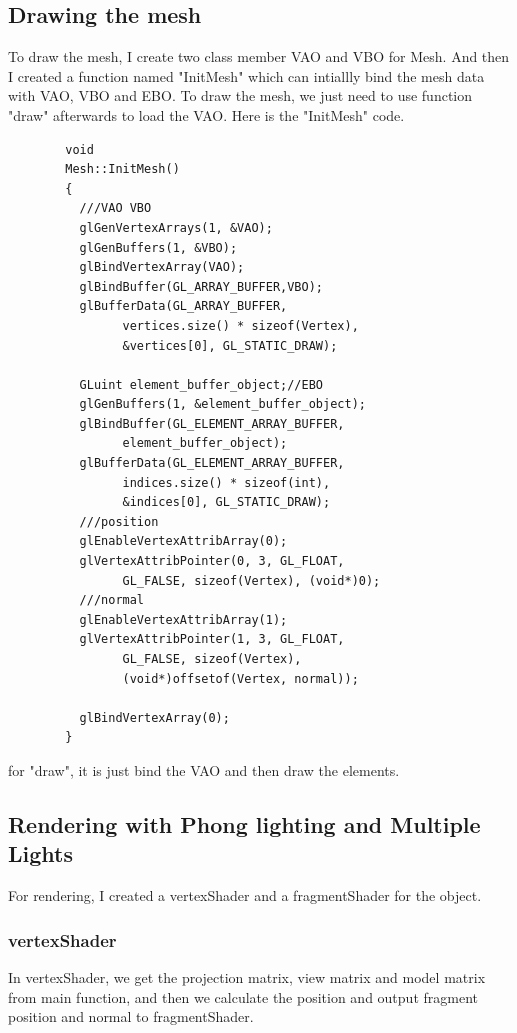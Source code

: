 \documentclass[acmtog]{acmart}
\begin{document}
\subsection{Drawing the mesh}
	\quad To draw the mesh, I create two class member VAO and VBO for Mesh. And then I created a function named "InitMesh" which
	can intiallly bind the mesh data with VAO, VBO and EBO. To draw the mesh, we just need to use function
	"draw" afterwards to load the VAO. Here is the "InitMesh" code.\\
	\begin{lstlisting}
		void 
		Mesh::InitMesh()
		{
		  ///VAO VBO
		  glGenVertexArrays(1, &VAO);
		  glGenBuffers(1, &VBO);
		  glBindVertexArray(VAO);
		  glBindBuffer(GL_ARRAY_BUFFER,VBO);
		  glBufferData(GL_ARRAY_BUFFER,
		   		vertices.size() * sizeof(Vertex),
		    	&vertices[0], GL_STATIC_DRAW);
		
		  GLuint element_buffer_object;//EBO
		  glGenBuffers(1, &element_buffer_object);
		  glBindBuffer(GL_ELEMENT_ARRAY_BUFFER,
		   		element_buffer_object);
		  glBufferData(GL_ELEMENT_ARRAY_BUFFER, 
		  		indices.size() * sizeof(int), 
		  		&indices[0], GL_STATIC_DRAW);
		  ///position
		  glEnableVertexAttribArray(0);
		  glVertexAttribPointer(0, 3, GL_FLOAT,
		   		GL_FALSE, sizeof(Vertex), (void*)0);
		  ///normal
		  glEnableVertexAttribArray(1);
		  glVertexAttribPointer(1, 3, GL_FLOAT,
		   		GL_FALSE, sizeof(Vertex), 
		   		(void*)offsetof(Vertex, normal));
		
		  glBindVertexArray(0);
		}
	\end{lstlisting}
	for "draw", it is just bind the VAO and then draw the elements.
	\subsection{Rendering with Phong lighting and Multiple Lights}
		\quad For rendering, I created a vertexShader and a fragmentShader for the object.
		\subsubsection{vertexShader}
		\quad In vertexShader, we get the projection matrix, view matrix and model matrix
		from main function, and then we calculate the position and output fragment position and normal
		to fragmentShader.
\end{document}
